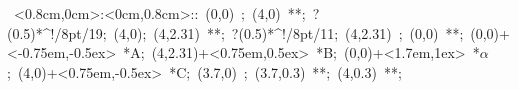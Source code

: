 \hbox{
\xy    <0.8cm,0cm>:<0cm,0.8cm>::
       (0,0) ; (4,0) **\dir{-}; ?(0.5)*^!/8pt/{19};
       (4,0); (4,2.31) **\dir{-}; ?(0.5)*^!/8pt/{11}; 
       (4,2.31) ; (0,0) **\dir{-};  
       (0,0)+<-0.75em,-0.5ex> *{A};
       (4,2.31)+<0.75em,0.5ex> *{B};
       (0,0)+<1.7em,1ex> *\hbox{$\alpha$};
       (4,0)+<0.75em,-0.5ex> *{C};
	(3.7,0) ; (3.7,0.3) **\dir{-}; (4,0.3) **\dir{-};
       \endxy}
	   
